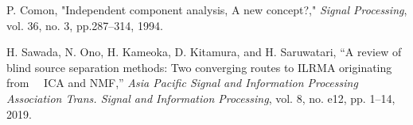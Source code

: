 \documentclass[a4j]{jsarticle}
\begin{document}
\begin{thebibliography}{9}%

P. Comon, "Independent component analysis, A new concept?," {\em Signal Processing}, vol. 36, no. 3, pp.287--314, 1994.

H. Sawada, N. Ono, H. Kameoka, D. Kitamura, and H. Saruwatari, ``A review of
blind source separation methods: Two converging routes to ILRMA originating from　
ICA and NMF,'' {\em Asia Pacific Signal and Information Processing Association Trans. Signal and Information Processing}, vol. 8, no. e12,
pp. 1–14, 2019.



\end{thebibliography}
\end{document}
